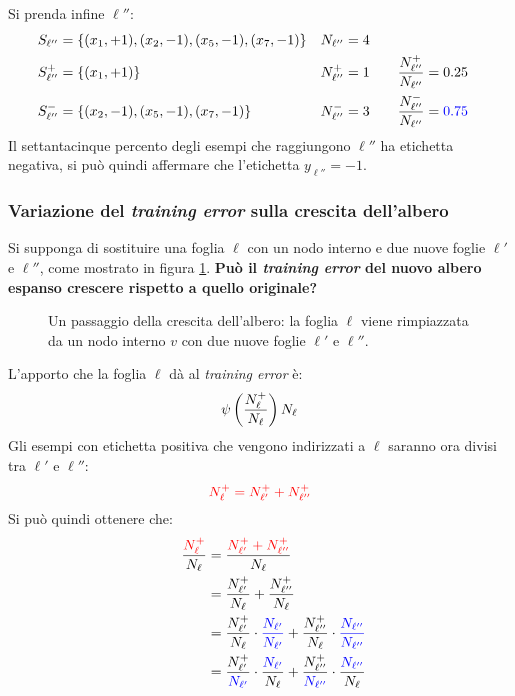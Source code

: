 Si prenda infine $\ell''$:
$$
\begin{aligned}
    &S_{\ell''} = \{ (x_1,+1),(x_2,-1),(x_5,-1),(x_7,-1) \} & N_{\ell''}=4 \\
    &S_{\ell''}^+ = \{ (x_1,+1) \} & N_{\ell''}^+=1 & \qquad \frac{N_{\ell''}^+}{N_{\ell''}}=0.25 \\
    &S_{\ell''}^- = \{ (x_2,-1),(x_5,-1),(x_7,-1) \} & N_{\ell''}^-=3 
        & \qquad \frac{N_{\ell''}^-}{N_{\ell''}}={\color{blue}0.75} \\
\end{aligned}
$$
Il {\color{blue}settantacinque percento} degli esempi che raggiungono $\ell''$ ha etichetta
negativa, si può quindi affermare che l'etichetta $y_{\ell''}=-1$.

\subsubsection{Variazione del \textit{training error} sulla crescita dell'albero}

Si supponga di sostituire una foglia $\ell$ con un nodo interno e due nuove foglie $\ell'$
e $\ell''$, come mostrato in figura \ref{fig:tree_growth}. \textbf{Può il \textit{training
error} del nuovo albero espanso crescere rispetto a quello originale?}

\begin{figure}[h]
    \centering
    
    \caption{Un passaggio della crescita dell'albero: la foglia $\ell$ viene
        rimpiazzata da un nodo interno $v$ con due nuove foglie $\ell'$ e $\ell''$.
        \label{fig:tree_growth}}
\end{figure}

L'apporto che la foglia $\ell$ dà al \textit{training error} è:
\begin{equation} \psi \left(\frac{N_{\ell}^+}{N_{\ell}}\right)N_{\ell}\label{eq:tree_1}\end{equation}
Gli esempi con etichetta positiva che vengono indirizzati a $\ell$ saranno ora divisi tra
$\ell'$ e $\ell''$:
$$ {\color{red}N_{\ell}^+ = N_{\ell'}^+ + N_{\ell''}^+} $$
Si può quindi ottenere che:
\begin{align}
    \qquad \frac{\color{red}N_{\ell}^+}{N_{\ell}} 
        &= \frac{\color{red}N_{\ell'}^+ + N_{\ell''}^+}{N_{\ell}} \notag\\
        &= \frac{N_{\ell'}^+}{N_{\ell}}+\frac{N_{\ell''}^+}{N_{\ell}} \notag\\
        &= \frac{N_{\ell'}^+}{N_{\ell}}\cdot{\color{blue}\frac{N_{\ell'}}{N_{\ell'}}}
            +\frac{N_{\ell''}^+}{N_{\ell}}\cdot{\color{blue}\frac{N_{\ell''}}{N_{\ell''}}}\notag\\
        &= \frac{N_{\ell'}^+}{\color{blue}N_{\ell'}}\cdot
            \frac{\color{blue}N_{\ell'}}{N_{\ell}}
            +\frac{N_{\ell''}^+}{\color{blue}N_{\ell''}}\cdot
            \frac{\color{blue}N_{\ell''}}{N_{\ell}} \label{eq:tree_2}
\end{align}

